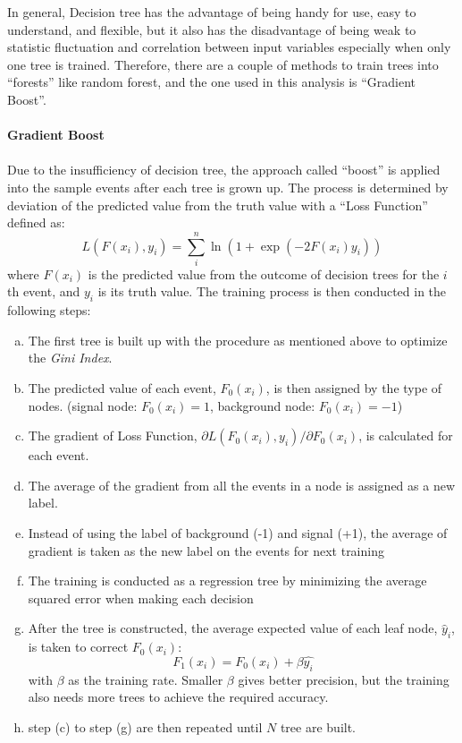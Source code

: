 In general, Decision tree has the advantage of being handy for use, easy to understand, and flexible, but it also has the disadvantage of being weak to statistic fluctuation and correlation between input variables especially when only one tree is trained. Therefore, there are a couple of methods to train trees into ``forests'' like random forest, and the one used in this analysis is ``Gradient Boost''.
\\
\\{\bf Gradient Boost}
\\
\\Due to the insufficiency of decision tree, the approach called ``boost'' is applied into the sample events after each tree is grown up. The process is determined by deviation of the predicted value from the truth value with a ``Loss Function'' defined as:
\begin{equation}
L(F(x_{i}), y_{i}) = \sum_{i}^{n}\ln(1+\exp{(-2F(x_i)y_{i})})
\end{equation} 
where $F(x_{i})$ is the predicted value from the outcome of decision trees for the $i$th event, and $y_{i}$ is its truth value. The training process is then conducted in the following steps:
\begin{enumerate}[(a)]
	\item  The first tree is built up with the procedure as mentioned above to optimize the \textit{Gini Index}.
	\item  The predicted value of each event, $F_{0}(x_i)$, is then assigned by the type of nodes. (signal node: $F_{0}(x_i)=1$, background node: $F_{0}(x_i)=-1$)
	\item  The gradient of Loss Function, $\partial L(F_{0}(x_{i}), y_{i}) / \partial F_{0}(x_i)$, is calculated for each event.
	\item  The average of the gradient from all the events in a node is assigned as a new label.
	\item  Instead of using the label of background (-1) and signal (+1), the average of gradient is taken as the new label on the events for next training
	\item  The training is conducted as a regression tree by minimizing the average squared error when making each decision
	\item  After the tree is constructed, the average expected value of each leaf node, $\hat{y}_{i}$, is taken to correct $F_{0}(x_i)$:
	\begin{equation}
	F_{1}(x_i) = F_{0}(x_i)+\beta \hat{y_i}
	\end{equation}
	with $\beta$ as the training rate. Smaller $\beta$ gives better precision, but the training also needs more trees to achieve the required accuracy. 
	\item step (c) to step (g)  are then repeated until $N$ tree are built.
\end{enumerate}
